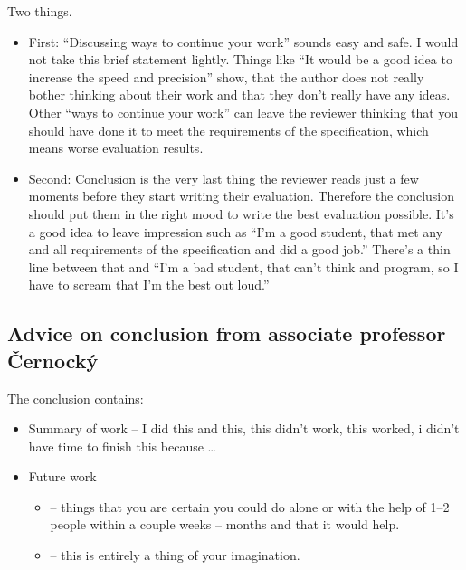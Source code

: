 {{\begin{samepage}
\noindent Two things.
\begin{itemize}
  \item{First: ``Discussing ways to continue your work'' sounds easy and safe. I would not take this brief statement lightly. Things like ``It would be a good idea to increase the speed and precision'' show, that the author does not really bother thinking about their work and that they don't really have any ideas. Other ``ways to continue your work'' can leave the reviewer thinking that you should have done it to meet the requirements of the specification, which means worse evaluation results.}
  \item{Second: Conclusion is the very last thing the reviewer reads just a few moments before they start writing their evaluation. Therefore the conclusion should put them in the right mood to write the best evaluation possible. It's a good idea to leave impression such as ``I'm a good student, that met any and all requirements of the specification and did a good job.'' There's a thin line between that and ``I'm a bad student, that can't think and program, so I have to scream that I'm the best out loud.''}
\end{itemize}
\end{samepage}

\subsection*{Advice on conclusion from associate professor Černocký}

The conclusion contains:
\begin{itemize}
  \item{Summary of work -- I did this and this, this didn't work, this worked, i didn't have time to finish this because \ldots}
  \item{Future work
    \begin{itemize}
      \item{ -- things that you are certain you could do alone or with the help of 1--2 people within a couple weeks -- months and that it would help.}
      \item{ -- this is entirely a thing of your imagination.}
    \end{itemize}}
\end{itemize}

}}
